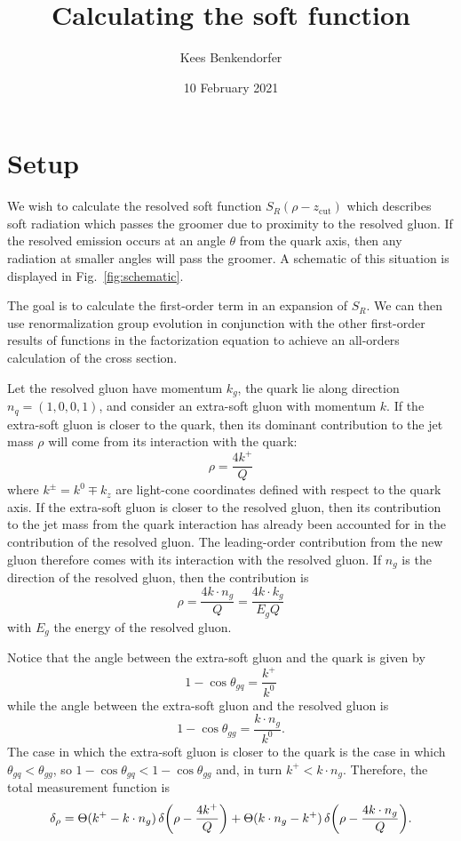 \documentclass[11pt,twoside,reqno]{amsart}
\title{Calculating the soft function}
\author{Kees Benkendorfer}
\date{10 February 2021}
\theoremstyle{plain}
\theoremstyle{remark}
\theoremstyle{definition}
\theoremstyle{remark}
\theoremstyle{definition}
\theoremstyle{definition}
\newcommand{\zcut}{z_\mathrm{cut}}
\begin{document}
\maketitle

\tableofcontents

\section{Setup}
	We wish to calculate the resolved soft function $S_R(\rho - \zcut)$ which describes soft radiation which passes the groomer due to proximity to the resolved gluon. If the resolved emission occurs at an angle $\theta$ from the quark axis, then any radiation at smaller angles will pass the groomer. A schematic of this situation is displayed in Fig.~\ref{fig:schematic}.

	The goal is to calculate the first-order term in an expansion of $S_R$. We can then use renormalization group evolution in conjunction with the other first-order results of functions in the factorization equation to achieve an all-orders calculation of the cross section.

	Let the resolved gluon have momentum $k_g$, the quark lie along direction $n_q = (1, 0, 0, 1)$, and consider an extra-soft gluon with momentum $k$. If the extra-soft gluon is closer to the quark, then its dominant contribution to the jet mass $\rho$ will come from its interaction with the quark:
	\begin{equation}
		\rho = \frac{4 k^+}{Q}
	\end{equation}
	where $k^{\pm} = k^0 \mp k_z$ are light-cone coordinates defined with respect to the quark axis. If the extra-soft gluon is closer to the resolved gluon, then its contribution to the jet mass from the quark interaction has already been accounted for in the contribution of the resolved gluon. The leading-order contribution from the new gluon therefore comes with its interaction with the resolved gluon. If $n_g$ is the direction of the resolved gluon, then the contribution is
	\begin{equation}
		\rho = \frac{4 k \cdot n_g}{Q} = \frac{4 k \cdot k_g}{E_g Q}
	\end{equation}
	with $E_g$ the energy of the resolved gluon.

	Notice that the angle between the extra-soft gluon and the quark is given by
	\begin{equation}
		1 - \cos\theta_{gq} = \frac{k^+}{k^0}
	\end{equation}
	while the angle between the extra-soft gluon and the resolved gluon is
	\begin{equation}
		1 - \cos\theta_{gg} = \frac{k \cdot n_g}{k^0}.
	\end{equation}
	The case in which the extra-soft gluon is closer to the quark is the case in which $\theta_{gq} < \theta_{gg}$, so $1 - \cos\theta_{gq} < 1 - \cos\theta_{gg}$ and, in turn $k^+ < k \cdot n_g$. Therefore, the total measurement function is
	\begin{equation}
		\delta_\rho = \Theta(k^+ - k\cdot n_g)\,\delta\qty(\rho - \frac{4k^+}{Q}) + \Theta(k\cdot n_g - k^+)\,\delta\qty(\rho - \frac{4k\cdot n_g}{Q}).
	\end{equation}
\end{document}
